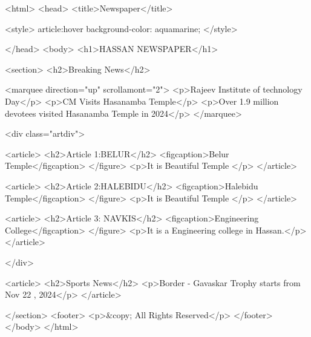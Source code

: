 <html> 
<head>  
<title>Newspaper</title> 

<style> 
article:hover{ 
background-color: aquamarine; 
}
</style> 

</head> 
<body> 
<h1>HASSAN NEWSPAPER</h1> 

<section>  
<h2>Breaking News</h2> 

<marquee direction="up"  scrollamont="2"> 
<p>Rajeev Institute of technology Day</p> 
<p>CM Visits Hasanamba Temple</p> 
<p>Over 1.9 million devotees visited Hasanamba Temple in 2024</p> 
</marquee> 

        <div class="artdiv"> 
        
            <article> 
            <h2>Article 1:BELUR</h2>  
                <figcaption>Belur Temple</figcaption> 
            </figure> 
          <p>It is Beautiful Temple </p> 
        </article> 
        
        <article> 
            <h2>Article 2:HALEBIDU</h2> 
                <figcaption>Halebidu Temple</figcaption> 
            </figure> 
                <p>It is Beautiful Temple </p> 
        </article> 

        <article> 
            <h2>Article 3: NAVKIS</h2> 
                <figcaption>Engineering College</figcaption> 
            </figure> 
<p>It is a Engineering college in Hassan.</p> 
        </article> 

        </div> 

        <article> 
            <h2>Sports News</h2> 
            <p>Border - Gavaskar Trophy starts from Nov 22 , 2024</p> 
        </article>

    </section>     
    <footer> 
        <p>&copy; All Rights Reserved</p> 
</footer> 
</body> 
</html> 

